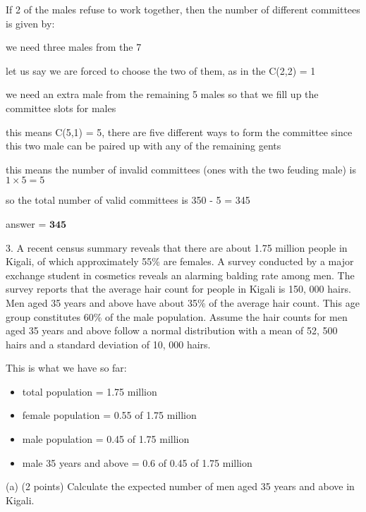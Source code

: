 \documentclass{article}
\begin{document}
If 2 of the males refuse to work together, then the number of different committees is given by:

we need three males from the 7\newline

let us say we are forced to choose the two of them, as in the C(2,2) = 1\newline

we need an extra male from the remaining 5 males so that we fill up the committee slots for males\newline

this means C(5,1) = 5, there are five different ways to form the committee since this two male can be paired up with any of the remaining gents\newline

this means the number of invalid committees (ones with the two feuding male) is  \(1 \times 5 = 5\)\newline

so the total number of valid committees is 350 - 5 = 345\newline

answer = \(\mathbf{345}\)\newline


3. A recent census summary reveals that there are about 1.75 million people in Kigali, of which approximately 55\% are females. A survey conducted by a major exchange student in cosmetics reveals an alarming balding rate among men. The survey reports that the average hair count for people in Kigali is 150, 000 hairs. Men aged 35 years and above have about 35\% of the average
hair count. This age group constitutes 60\% of the male population. Assume the hair counts for men aged 35 years and above follow a normal distribution with a mean of 52, 500 hairs and a standard deviation of 10, 000 hairs.

This is what we have so far:

\begin{itemize}
    \item total population = 1.75 million
    \item female population = 0.55 of 1.75 million
    \item male population = 0.45 of 1.75 million
    \item male 35 years and above = 0.6 of 0.45 of 1.75 million
\end{itemize}


(a) (2 points) Calculate the expected number of men aged 35 years and above in Kigali.
\end{document}
